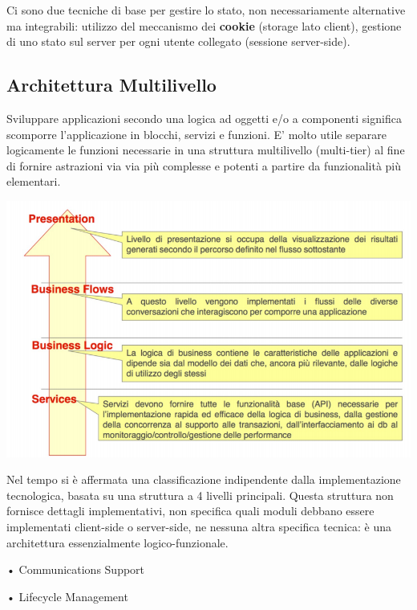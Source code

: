     \vspace{3mm}
    
    Ci sono due tecniche di base per gestire lo stato, non necessariamente alternative ma integrabili: utilizzo del meccanismo dei \textbf{cookie} (storage lato client), gestione di uno stato sul server per ogni utente collegato (sessione server-side).
    
    \subsection{Architettura Multilivello}
    
    Sviluppare applicazioni secondo una logica ad oggetti e/o a componenti significa scomporre l’applicazione in blocchi, servizi e
    funzioni. E' molto utile separare logicamente le funzioni necessarie in una struttura multilivello (multi-tier) al fine di fornire astrazioni via via più complesse e potenti a partire da funzionalità più elementari. 
    
    \begin{center}
        \includegraphics[scale=0.5]{images/ApplicationServer.png}
    \end{center}
    
    Nel tempo si è affermata una classificazione indipendente dalla implementazione tecnologica, basata su una struttura a 4 livelli principali. Questa struttura non fornisce dettagli implementativi, non specifica quali moduli debbano essere implementati client-side o server-side, ne nessuna altra specifica tecnica: è una architettura essenzialmente logico-funzionale.
    
    • Communications Support
    
    • Lifecycle Management
    
